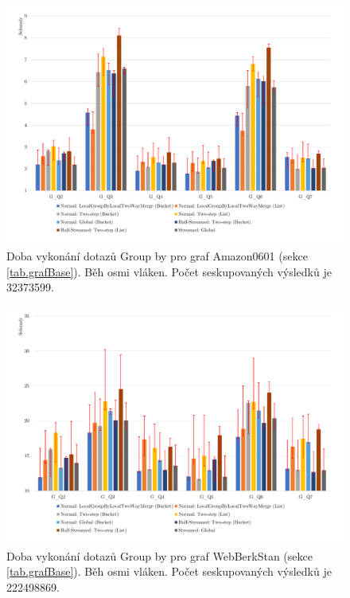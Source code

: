 \begin{figure}[!htp]
\includegraphics[width=\linewidth]{../img/amazonGroupByPar.pdf}\centering
\caption{Doba vykonání dotazů Group by pro graf Amazon0601 (sekce \ref{tab.grafBase}). Běh osmi vláken. Počet seskupovaných výsledků je 32373599.}
\label{figure.amazonGroupByPar}
\end{figure}

\begin{figure}[!htp]
\includegraphics[width=\linewidth]{../img/webberkstanGroupByPar.pdf}\centering
\caption{Doba vykonání dotazů Group by pro graf WebBerkStan (sekce \ref{tab.grafBase}). Běh osmi vláken. Počet seskupovaných výsledků je 222498869.}
\label{figure.webberkstanGroupByPar}
\end{figure}

\clearpage

